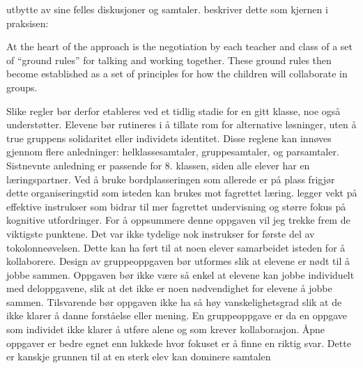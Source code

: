 \documentclass[main.tex]{subfiles}
\begin{document}
utbytte av sine felles diskusjoner og samtaler.  beskriver dette som kjernen i 
praksisen:
\begin{displayquote}
At the heart of the approach is the negotiation by each teacher and class of a set of ``ground
rules'' for talking and working together. These ground rules then become established as a set of 
principles for how the children will collaborate in groups.
\end{displayquote}
Slike regler bør derfor etableres ved et tidlig stadie for en gitt klasse, noe 
også understøtter. Elevene bør rutineres i å tillate rom for alternative løsninger, uten å true 
gruppens solidaritet eller individets identitet. Disse reglene kan innøves gjennom flere 
anledninger: helklassesamtaler, gruppesamtaler, og parsamtaler. Sistnevnte anledning er passende
for 8. klassen, siden alle elever har en læringspartner. Ved å bruke bordplasseringen som allerede 
er på plass frigjør dette organiseringstid som isteden kan brukes mot fagrettet læring. 
 legger vekt på effektive instrukser som bidrar til mer fagrettet undervisning og 
større fokus på kognitive utfordringer.
\newline
\newline
For å oppsummere denne oppgaven vil jeg trekke frem de viktigste punktene. Det var ikke tydelige 
nok instrukser for første del av tokolonneøvelsen. Dette kan ha ført til at noen elever 
samarbeidet isteden for å kollaborere. Design av gruppeoppgaven bør utformes slik at elevene er 
nødt til å jobbe sammen. Oppgaven bør ikke være så enkel at elevene kan jobbe individuelt med 
deloppgavene, slik at det ikke er noen nødvendighet for elevene å jobbe sammen. Tilsvarende 
bør oppgaven ikke ha så høy vanskelighetsgrad slik at de ikke klarer å danne forståelse eller mening. 
En gruppeoppgave er da en oppgave som individet ikke klarer å utføre alene og som 
krever kollaborasjon. Åpne oppgaver er bedre egnet enn lukkede hvor fokuset er å finne 
en riktig svar. Dette er kanskje grunnen til at en sterk elev kan dominere samtalen 
\end{document}
